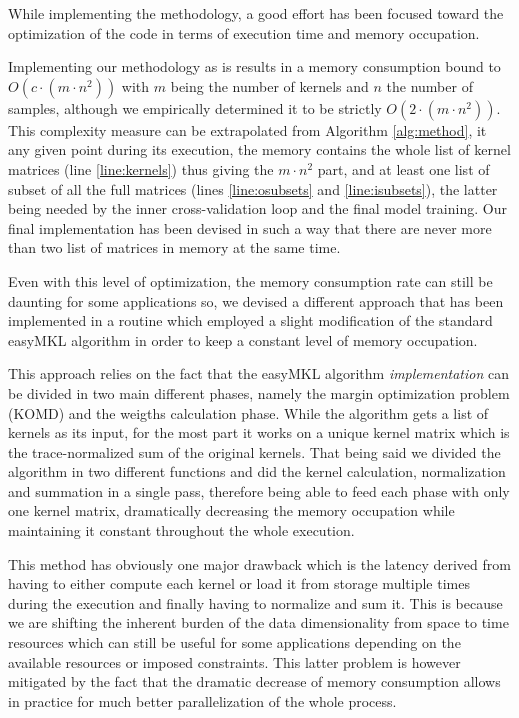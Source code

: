 While implementing the methodology, a good effort has been focused toward the
optimization of the code in terms of execution time and memory occupation.

Implementing our methodology as is results in a memory consumption bound to
$O(c \cdot (m\cdot n^2))$ with $m$ being the number of kernels and $n$ the number of samples,
although we empirically determined it to be strictly $O(2\cdot (m\cdot n^2))$.
This complexity measure can be extrapolated from  Algorithm \ref{alg:method},
it any given point during its execution, the memory contains the whole list
of kernel matrices (line \ref{line:kernels}) thus giving the $m\cdot n^2$ part,
and at least one list of subset of all the full matrices (lines \ref{line:osubsets}
and \ref{line:isubsets}), the latter being needed by the inner cross-validation
loop and the final model training.  Our final implementation has been devised in
such a way that there are never more than two list of matrices in memory at the
same time.  

Even with this level of optimization, the memory consumption rate can still be
daunting for some applications so, we devised a different approach that has been
implemented in a routine which employed a slight modification of the standard
easyMKL algorithm \cite{aiolli2015easymkl} in order to keep a constant level of memory
occupation.

This approach relies on the fact that the easyMKL algorithm \emph{implementation}
can be divided in two main different phases, namely the margin optimization problem
(KOMD) and the weigths calculation phase.
While the algorithm gets a list of kernels as its input, for the most part
it works on a unique kernel matrix which is the trace-normalized sum of the 
original kernels.
That being said we divided the algorithm in two different functions and did
the kernel calculation, normalization and summation in a single pass, therefore
being able to feed each phase with only one kernel matrix, dramatically decreasing
the memory occupation while maintaining it constant throughout the whole execution.

This method has obviously one major drawback which is the latency derived from
having to either compute each kernel or load it from storage multiple times
during the execution and finally having to normalize and sum it.
This is because we are shifting the inherent burden of the data dimensionality
from space to time resources which can still be useful for some applications
depending on the available resources or imposed constraints.
This latter problem is however mitigated by the fact that the dramatic decrease
of memory consumption allows in practice for much better parallelization of the
whole process.

